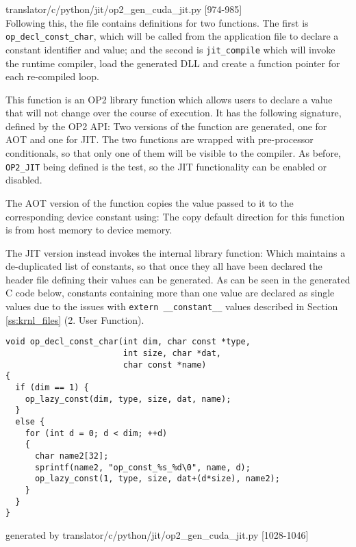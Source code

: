 \hspace*{\fill}\footnotesize{translator/c/python/jit/op2\_gen\_cuda\_jit.py [974-985]
\\
Following this, the file contains definitions for two functions. The first is \verb|op_decl_const_char|, which will be called from the application file to declare a constant identifier and value; and the second is \verb|jit_compile| which will invoke the runtime compiler, load the generated DLL and create a function pointer for each re-compiled loop.

This function is an OP2 library function which allows users to declare a value that will not change over the course of execution. It has the following signature, defined by the OP2 API\cite[p9]{manual}:
 Two versions of the function are generated, one for AOT and one for JIT. The two functions are wrapped with pre-processor conditionals, so that only one of them will be visible to the compiler. As before, \verb|OP2_JIT| being defined is the test, so the JIT functionality can be enabled or disabled.
\par
The AOT version of the function copies the value passed to it to the corresponding device constant using:
The copy default direction for this function is from host memory to device memory.
\par
The JIT version instead invokes the internal library function:
Which maintains a de-duplicated list of constants, so that once they all have been declared the header file defining their values can be generated. As can be seen in the generated C code below, constants containing more than one value are declared as single values due to the issues with \verb|extern __constant__| values described in Section \ref{ss:krnl_files} (2. User Function).
\begin{lstlisting}[linewidth = \textwidth, framesep=0pt]
void op_decl_const_char(int dim, char const *type,
                        int size, char *dat,
                        char const *name)
{
  if (dim == 1) {
    op_lazy_const(dim, type, size, dat, name);
  }
  else {
    for (int d = 0; d < dim; ++d)
    {
      char name2[32];
      sprintf(name2, "op_const_%s_%d\0", name, d);
      op_lazy_const(1, type, size, dat+(d*size), name2);
    }
  }
}
\end{lstlisting}
\vspace{-1em}
\hspace*{\fill}\footnotesize{generated by translator/c/python/jit/op2\_gen\_cuda\_jit.py [1028-1046]}

}
